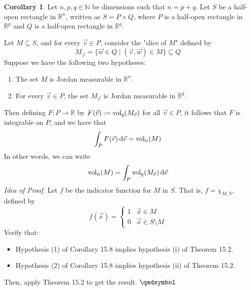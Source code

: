 \documentclass[11pt]{article}
\theoremstyle{definition}
\newtheorem{cor}[thm]{Corollary}
\newcommand{\N}{\ensuremath{\mathbb{N}}}
\newcommand{\R}{\ensuremath{\mathbb{R}}}
\begin{document}
\begin{cor}
Let $n, p, q \in \N$ be dimensions such that $n = p + q$. Let $S$ be a half-open rectangle in $\R^n$, written as $S = P \times Q$, where $P$ is a half-open rectangle in $\R^p$ and $Q$ is a half-open rectangle in $\R^q$.

Let $M \subseteq S$, and for every $\vec{v} \in P$, consider the "slice of $M$" defined by 
$$M_{\vec{v}} = \{\vec{w} \in Q \mid (\vec{v}, \vec{w}) \in M\} \subseteq Q$$
Suppose we have the following two hypotheses:
\vspace{-1.5ex}\begin{enumerate}[(1)]
\item The set $M$ is Jordan measurable in $\R^n$.
\item For every $\vec{v} \in P$, the set $M_{\vec{v}}$ is Jordan measurable in $\R^q$.
\end{enumerate}\vspace{-1.5ex}
Then defining $F : P \to \R$ by $F(\vec{v}) := {\rm vol}_q(M_{\vec{v}})$ for all $\vec{v} \in P$, it follows that $F$ is integrable on $P$, and we have that
$$\int_P F(\vec{v})\,{\rm d}\vec{v} = {\rm vol}_n(M)$$
In other words, we can write
$${\rm vol}_n(M) = \int_P {\rm vol}_q(M_{\vec{v}})\,{\rm d}\vec{v}$$
\emph{Idea of Proof.} Let $f$ be the indicator function for $M$ in $S$. That is, $f = \chi_{M;S}$, defined by
$$f(\vec{x}) = \begin{cases} 1 & \vec{x} \in M \\ 0 & \vec{x} \in S \setminus M \end{cases}$$
Verify that:
\vspace{-1.5ex}\begin{itemize}
    \item Hypothesis (1) of Corollary 15.8 implies hypothesis (i) of Theorem 15.2.
    \item Hypothesis (2) of Corollary 15.8 implies hypothesis (ii) of Theorem 15.2.
\end{itemize}\vspace{-1.5ex}
Then, apply Theorem 15.2 to get the result. \hfill $\qedsymbol$
\end{cor}
\end{document}
